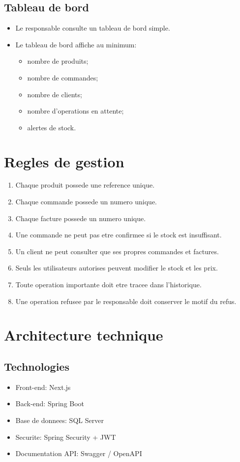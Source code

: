 \documentclass[12pt,a4paper]{article}
\begin{document}
\subsection{Tableau de bord}
\begin{itemize}
  \item Le responsable consulte un tableau de bord simple.
  \item Le tableau de bord affiche au minimum:
  \begin{itemize}
    \item nombre de produits;
    \item nombre de commandes;
    \item nombre de clients;
    \item nombre d'operations en attente;
    \item alertes de stock.
  \end{itemize}
\end{itemize}

\section{Regles de gestion}
\begin{enumerate}
  \item Chaque produit possede une reference unique.
  \item Chaque commande possede un numero unique.
  \item Chaque facture possede un numero unique.
  \item Une commande ne peut pas etre confirmee si le stock est insuffisant.
  \item Un client ne peut consulter que ses propres commandes et factures.
  \item Seuls les utilisateurs autorises peuvent modifier le stock et les prix.
  \item Toute operation importante doit etre tracee dans l'historique.
  \item Une operation refusee par le responsable doit conserver le motif du refus.
\end{enumerate}

\section{Architecture technique}

\subsection{Technologies}
\begin{itemize}
  \item Front-end: Next.js
  \item Back-end: Spring Boot
  \item Base de donnees: SQL Server
  \item Securite: Spring Security + JWT
  \item Documentation API: Swagger / OpenAPI
\end{itemize}
\end{document}

